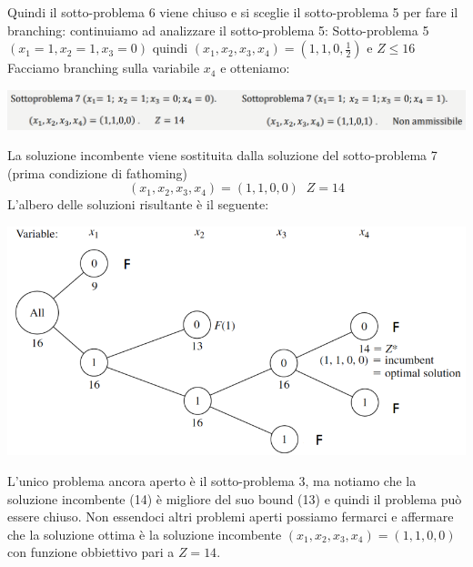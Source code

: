 \documentclass[12pt]{article}
\begin{document}
Quindi il sotto-problema 6 viene chiuso e si sceglie il sotto-problema 5 per fare il branching: continuiamo
ad analizzare il sotto-problema 5: \newline
Sotto-problema 5 $(x_1 = 1, x_2 =1, x_3 = 0)$ quindi $(x_1, x_2, x_3, x_4) = (1, 1, 0, \frac{1}{2})$ e $Z \leq 16$ \newline
Facciamo branching sulla variabile $x_4$ e otteniamo:
\begin{center}
    \includegraphics[width = 1\linewidth]{Images/70.png}
\end{center}
La soluzione incombente viene sostituita dalla soluzione del sotto-problema 7
(prima condizione di fathoming)
$$(x_1, x_2, x_3, x_4) = (1,1,0,0) \; \; Z = 14$$
L'albero delle soluzioni risultante è il seguente:
\begin{center}
    \includegraphics[width = 1\linewidth]{Images/71.png}
\end{center}
L'unico problema ancora aperto è il sotto-problema 3, ma notiamo che la soluzione incombente (14) è migliore
del suo bound (13) e quindi il problema può essere chiuso.
Non essendoci altri problemi aperti possiamo fermarci e affermare che la soluzione ottima è la soluzione
incombente $(x_1, x_2, x_3, x_4) = (1,1,0,0)$ con funzione obbiettivo pari a $Z = 14$.
\end{document}
